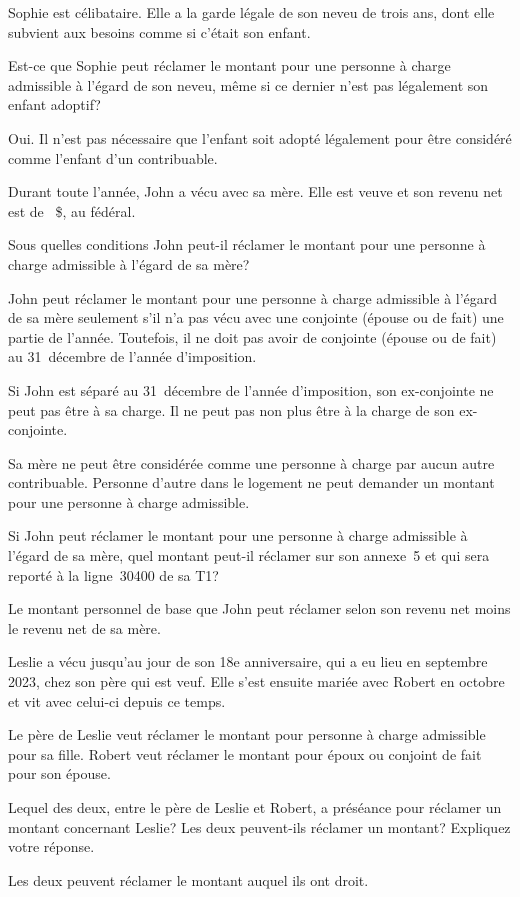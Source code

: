 \begin{question}
	Sophie est célibataire. Elle a la garde légale de son neveu de trois ans, dont elle subvient aux besoins comme si c'était son enfant. 
	
	Est-ce que Sophie peut réclamer le montant pour une personne à charge admissible à l'égard de son neveu, même si ce dernier n'est pas légalement son enfant adoptif?
\end{question}
Oui. Il n'est pas nécessaire que l'enfant soit adopté légalement pour être considéré comme l'enfant d'un contribuable.

\begin{question}
	Durant toute l'année, John a vécu avec sa mère. Elle est veuve et son revenu net est de ~\$, au fédéral.
\end{question}
\setcounter{sousQuestion}{0}
\begin{sousQuestion}
	Sous quelles conditions John peut-il réclamer le montant pour une personne à charge admissible à l'égard de sa mère?
\end{sousQuestion}
John peut réclamer le montant pour une personne à charge admissible à l'égard de sa mère seulement s'il n'a pas vécu avec une conjointe (épouse ou de fait) une partie de l'année. Toutefois, il ne doit pas avoir de conjointe (épouse ou de fait) au 31~décembre de l'année d'imposition.

Si John est séparé au 31~décembre de l'année d'imposition, son ex-conjointe ne peut pas être à sa charge. Il ne peut pas non plus être à la charge de son ex-conjointe.

Sa mère ne peut être considérée comme une personne à charge par aucun autre contribuable. Personne d'autre dans le logement ne peut demander un montant pour une personne à charge admissible.

\begin{sousQuestion}
	Si John peut réclamer le montant pour une personne à charge admissible à l'égard de sa mère, quel montant peut-il réclamer sur son annexe~5 et qui sera reporté à la ligne~30400 de sa T1?
\end{sousQuestion}
Le montant personnel de base que John peut réclamer selon son revenu net moins le revenu net de sa mère.

\begin{question}
	Leslie a vécu jusqu'au jour de son 18e anniversaire, qui a eu lieu en septembre 2023, chez son père qui est veuf. Elle s'est ensuite mariée avec Robert en octobre et vit avec celui-ci depuis ce temps.
	
	Le père de Leslie veut réclamer le montant pour personne à charge admissible pour sa fille. Robert veut réclamer le montant pour époux ou conjoint de fait pour son épouse.
	
	Lequel des deux, entre le père de Leslie et Robert, a préséance pour réclamer un montant concernant Leslie? Les deux peuvent-ils réclamer un montant? Expliquez votre réponse.
\end{question}
Les deux peuvent réclamer le montant auquel ils ont droit.

